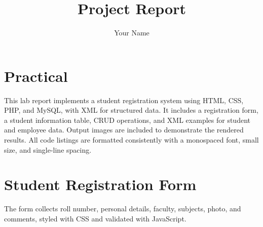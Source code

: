 \documentclass[a4paper,12pt]{article}
\date{} %
\title{Project Report} %
\author{Your Name} %
\begin{document}
{\centering \renewcommand{\contentsname}{ Table of Contents } \par}
\vspace{3\baselineskip} 
\tableofcontents
\newpage



\clearpage

\section{Practical}
This lab report implements a student registration system using HTML, CSS, PHP, and MySQL, with XML for structured data. It includes a registration form, a student information table, CRUD operations, and XML examples for student and employee data. Output images are included to demonstrate the rendered results. All code listings are formatted consistently with a monospaced font, small size, and single-line spacing.

\section{Student Registration Form}
The form collects roll number, personal details, faculty, subjects, photo, and comments, styled with CSS and validated with JavaScript.
\end{document}
